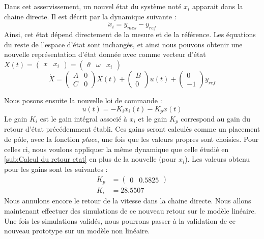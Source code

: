 		
Dans cet asservissement, un nouvel état du système noté $x_i$ apparait dans la chaine directe. Il est décrit par la dynamique suivante :
		\begin{equation}\label{eqn:dynamique_Xi}
		\dot{x}_i = y_{mes} - y_{ref}
		\end{equation}
		Ainsi, cet état dépend directement de la mesure et de la référence. Les équations du reste de l'espace d'état sont inchangés, et ainsi nous pouvons obtenir une nouvelle représentation d'état donnée avec comme vecteur d'état $X(t) = \begin{pmatrix}
		x & x_i
		\end{pmatrix} = \begin{pmatrix}
		\theta & \omega & x_i
		\end{pmatrix}$
\begin{equation}\label{eqn:EERetourIntegral}
\dot{X} = \begin{pmatrix}
A&0 \\ C& 0
\end{pmatrix}X(t) + \begin{pmatrix}
B \\ 0
\end{pmatrix}u(t) + \begin{pmatrix}
0 \\ -1
\end{pmatrix}y_{ref}
\end{equation}		
		
Nous posons ensuite la nouvelle loi de commande :\begin{equation}
		\label{eqn:loideCommande_retourIntegral}
		u(t) = -K_ix_i(t) - K_px(t)
\end{equation}
		Le gain $K_i$ est le gain intégral associé à $x_i$ et le gain $K_p$ correspond au gain du retour d'état précédemment établi. Ces gains seront calculés comme un placement de pôle, avec la fonction \emph{place}, une fois que les valeurs propres sont choisies. Pour celles ci, nous voulons appliquer la même dynamique que celle étudié en \ref{sub:Calcul du retour etat} en plus de la nouvelle (pour $x_i$). Les valeurs obtenu pour les gains sont les suivantes :
		\begin{align}
		K_p &= \begin{pmatrix}
		0&0.5825  
		\end{pmatrix}\\
		K_i &=  28.5507
 		\end{align}
 		Nous annulons encore le retour de la vitesse dans la chaine directe. Nous allons maintenant effectuer des simulations de ce nouveau retour sur le modèle linéaire. Une fois les simulations validés, nous pourrons passer à la validation de ce nouveau prototype sur un modèle non linéaire.
